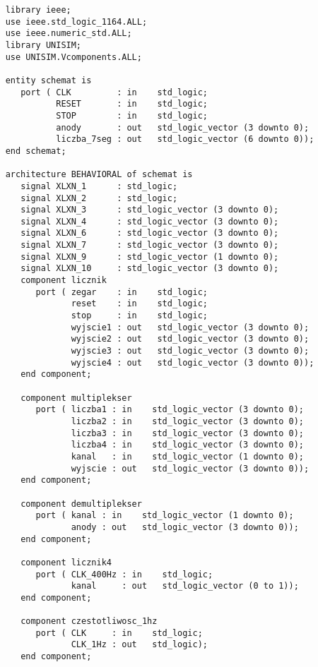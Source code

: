 \begin{lstlisting}
    library ieee;
    use ieee.std_logic_1164.ALL;
    use ieee.numeric_std.ALL;
    library UNISIM;
    use UNISIM.Vcomponents.ALL;
    
    entity schemat is
       port ( CLK         : in    std_logic; 
              RESET       : in    std_logic; 
              STOP        : in    std_logic; 
              anody       : out   std_logic_vector (3 downto 0); 
              liczba_7seg : out   std_logic_vector (6 downto 0));
    end schemat;
    
    architecture BEHAVIORAL of schemat is
       signal XLXN_1      : std_logic;
       signal XLXN_2      : std_logic;
       signal XLXN_3      : std_logic_vector (3 downto 0);
       signal XLXN_4      : std_logic_vector (3 downto 0);
       signal XLXN_6      : std_logic_vector (3 downto 0);
       signal XLXN_7      : std_logic_vector (3 downto 0);
       signal XLXN_9      : std_logic_vector (1 downto 0);
       signal XLXN_10     : std_logic_vector (3 downto 0);
       component licznik
          port ( zegar    : in    std_logic; 
                 reset    : in    std_logic; 
                 stop     : in    std_logic; 
                 wyjscie1 : out   std_logic_vector (3 downto 0); 
                 wyjscie2 : out   std_logic_vector (3 downto 0); 
                 wyjscie3 : out   std_logic_vector (3 downto 0); 
                 wyjscie4 : out   std_logic_vector (3 downto 0));
       end component;
       
       component multiplekser
          port ( liczba1 : in    std_logic_vector (3 downto 0); 
                 liczba2 : in    std_logic_vector (3 downto 0); 
                 liczba3 : in    std_logic_vector (3 downto 0); 
                 liczba4 : in    std_logic_vector (3 downto 0); 
                 kanal   : in    std_logic_vector (1 downto 0); 
                 wyjscie : out   std_logic_vector (3 downto 0));
       end component;
       
       component demultiplekser
          port ( kanal : in    std_logic_vector (1 downto 0); 
                 anody : out   std_logic_vector (3 downto 0));
       end component;
       
       component licznik4
          port ( CLK_400Hz : in    std_logic; 
                 kanal     : out   std_logic_vector (0 to 1));
       end component;
       
       component czestotliwosc_1hz
          port ( CLK     : in    std_logic; 
                 CLK_1Hz : out   std_logic);
       end component;
       

\end{lstlisting}
